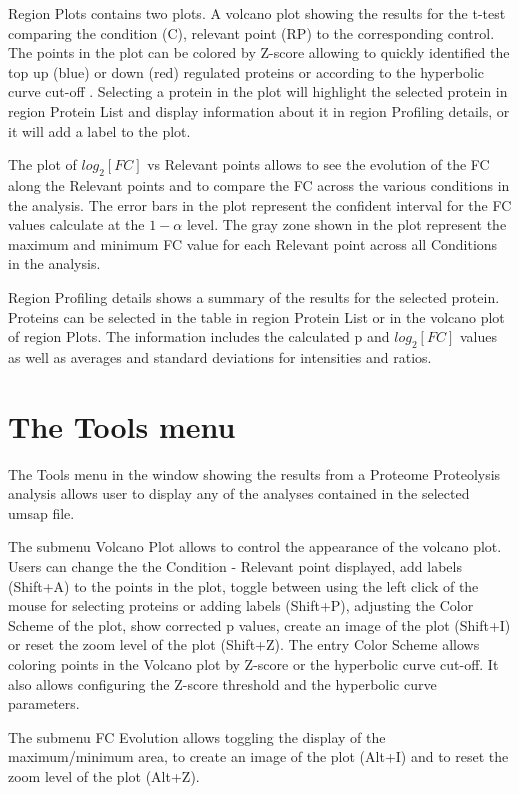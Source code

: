 Region Plots contains two plots. A volcano plot showing the results for the t-test
comparing the condition (C), relevant point (RP) to the corresponding control. The
points in the plot can be colored by Z-score allowing to quickly identified the top
up (blue) or down (red) regulated proteins or according to the hyperbolic curve cut-off
\cite{LI2012}. Selecting a protein in the plot will highlight the selected protein
in region Protein List and display information about it in region Profiling details,
or it will add a label to the plot.

The plot of $log_2[FC]$ vs Relevant points allows to see the evolution of the FC
along the Relevant points and to compare the FC across the various conditions in
the analysis. The error bars in the plot represent the confident interval for the
FC values calculate at the $1-\alpha$ level. The gray zone shown in the plot represent
the maximum and minimum FC value for each Relevant point across all Conditions in
the analysis.

Region Profiling details shows a summary of the results for the selected protein.
Proteins can be selected in the table in region Protein List or in the volcano plot
of region Plots. The information includes the calculated p and $log_2[FC]$ values
as well as averages and standard deviations for intensities and ratios.

\section{The Tools menu}
\label{sec:protprofTools}

The Tools menu in the window showing the results from a Proteome Proteolysis analysis
allows user to display any of the analyses contained in the selected umsap file.

The submenu Volcano Plot allows to control the appearance of the volcano plot. Users
can change the the Condition - Relevant point displayed, add labels (Shift+A) to
the points in the plot, toggle between using the left click of the mouse for selecting
proteins or adding labels (Shift+P), adjusting the Color Scheme of the plot, show
corrected p values, create an image of the plot (Shift+I) or reset the zoom level of
the plot (Shift+Z). The entry Color Scheme allows coloring points in the Volcano plot
by Z-score or the hyperbolic curve cut-off. It also allows configuring the Z-score
threshold and the hyperbolic curve parameters.

The submenu FC Evolution allows toggling the display of the maximum/minimum area,
to create an image of the plot (Alt+I) and to reset the zoom level of the plot (Alt+Z).

